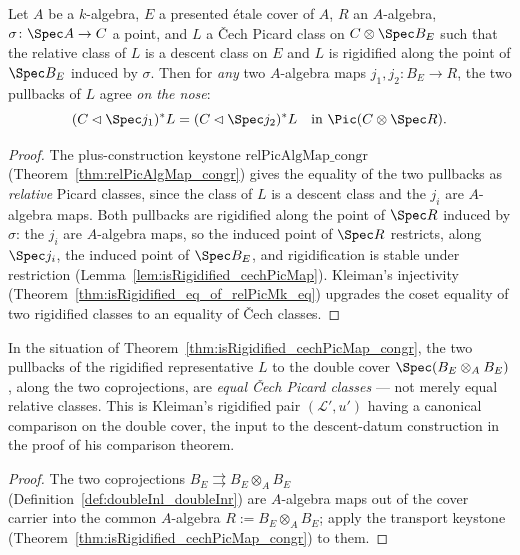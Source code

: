 \begin{theorem}
  \label{thm:isRigidified_cechPicMap_congr}
  \leanok
  Let \(A\) be a \(k\)-algebra, \(E\) a presented \'etale cover of \(A\), \(R\) an
  \(A\)-algebra, \(\sigma \colon \Spec A \to C\) a point, and \(L\) a \v Cech Picard class on
  \(C \otimes \Spec B_E\) such that the relative class of \(L\) is a descent class on \(E\)
  and \(L\) is rigidified along the point of \(\Spec B_E\) induced by \(\sigma\). Then for
  \emph{any} two \(A\)-algebra maps \(j_1, j_2 \colon B_E \to R\), the two pullbacks of \(L\)
  agree \emph{on the nose}:
  \[
    (C \lhd \Spec j_1)^{*} L = (C \lhd \Spec j_2)^{*} L \quad\text{in } \Pic(C \otimes \Spec R).
  \]
\end{theorem}
\begin{proof}
  \leanok
  The plus-construction keystone \(\mathrm{relPicAlgMap\_congr}\)
  (Theorem~\ref{thm:relPicAlgMap_congr}) gives the equality of the two pullbacks as
  \emph{relative} Picard classes, since the class of \(L\) is a descent class and the
  \(j_i\) are \(A\)-algebra maps. Both pullbacks are rigidified along the point of
  \(\Spec R\) induced by \(\sigma\): the \(j_i\) are \(A\)-algebra maps, so the induced point
  of \(\Spec R\) restricts, along \(\Spec j_i\), the induced point of \(\Spec B_E\), and
  rigidification is stable under restriction (Lemma~\ref{lem:isRigidified_cechPicMap}).
  Kleiman's injectivity (Theorem~\ref{thm:isRigidified_eq_of_relPicMk_eq}) upgrades the
  coset equality of two rigidified classes to an equality of \v Cech classes.
\end{proof}

\begin{theorem}
  \label{thm:isRigidified_cechPicMap_doubleInl_eq_doubleInr}
  \leanok
  In the situation of Theorem~\ref{thm:isRigidified_cechPicMap_congr}, the two pullbacks of
  the rigidified representative \(L\) to the double cover \(\Spec(B_E \otimes_A B_E)\), along
  the two coprojections, are \emph{equal \v Cech Picard classes} — not merely equal relative
  classes. This is Kleiman's rigidified pair \((\mathcal L', u')\) having a canonical comparison on
  the double cover, the input to the descent-datum construction in the proof of his
  comparison theorem.
\end{theorem}
\begin{proof}
  \leanok
  The two coprojections \(B_E \rightrightarrows B_E \otimes_A B_E\)
  (Definition~\ref{def:doubleInl_doubleInr}) are \(A\)-algebra maps out of the cover carrier
  into the common \(A\)-algebra \(R := B_E \otimes_A B_E\); apply the transport keystone
  (Theorem~\ref{thm:isRigidified_cechPicMap_congr}) to them.
\end{proof}

